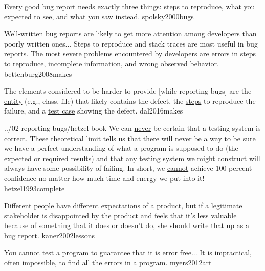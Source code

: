 \documentclass{article}
\begin{document}

  {Every good bug report needs exactly three things: \ul{steps} to reproduce, what you \ul{expected} to see, and what you \ul{saw} instead.}
  {spolsky2000bugs}

  {Well-written bug reports are likely to get \ul{more attention} among developers than poorly written ones... Steps to reproduce and stack traces are most useful in bug reports. The most severe problems encountered by developers are errors in steps to reproduce, incomplete information, and wrong observed behavior.}
  {bettenburg2008makes}

  {The elements considered to be harder to provide [while reporting bugs] are the \ul{entity} (e.g., class, file) that likely contains the defect, the \ul{steps} to reproduce the failure, and a \ul{test case} showing the defect.}
  {dal2016makes}


\lnQuote
  {../02-reporting-bugs/hetzel-book}
  {We can \ul{never} be certain that a testing system is correct. These theoretical limit tells us that there will \ul{never} be a way to be sure we have a perfect understanding of what a program is supposed to do (the expected or required results) and that any testing system we might construct will always have some possibility of failing. In short, we \ul{cannot} achieve 100 percent confidence no matter how much time and energy we put into it!}
  {hetzel1993complete}

  {Different people have different expectations of a product, but if a legitimate stakeholder is disappointed by the product and feels that it's less valuable because of something that it does or doesn't do, she should write that up as a bug report.}
  {kaner2002lessons}

  {You cannot test a program to guarantee that it is error free... It is impractical, often impossible, to find \ul{all} the errors in a program.}
  {myers2012art}


\end{document}
